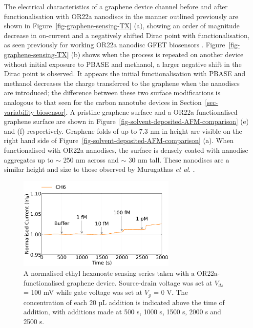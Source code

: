 \documentclass[
  a4paper,
]{scrbook}
\begin{document}
The electrical characteristics of a graphene device channel before and
after functionalisation with OR22a nanodiscs in the manner outlined
previously are shown in Figure~\ref{fig-graphene-sensing-TX} (a),
showing an order of magnitude decrease in on-current and a negatively
shifted Dirac point with functionalisation, as seen previously for
working OR22a nanodisc GFET biosensors \autocite{Murugathas2020}.
Figure~\ref{fig-graphene-sensing-TX} (b) shows when the process is
repeated on another device without initial exposure to PBASE and
methanol, a larger negative shift in the Dirac point is observed. It
appears the initial functionalisation with PBASE and methanol decreases
the charge transferred to the graphene when the nanodiscs are
introduced; the difference between these two surface modifications is
analogous to that seen for the carbon nanotube devices in
Section~\ref{sec-variability-biosensor}. A pristine graphene surface and
a OR22a-functionalised graphene surface are shown in
Figure~\ref{fig-solvent-deposited-AFM-comparison} (e) and (f)
respectively. Graphene folds of up to 7.3 nm in height are visible on
the right hand side of Figure~\ref{fig-solvent-deposited-AFM-comparison}
(a). When functionalised with OR22a nanodiscs, the surface is densely
coated with nanodisc aggregates up to \(\sim\) 250 nm across and
\(\sim\) 30 nm tall. These nanodiscs are a similar height and size to
those observed by Murugathas \emph{et al.} \autocite{Murugathas2020}.

\begin{figure}

{\centering \includegraphics[width=0.7\textwidth,height=\textheight]{figures/ch8/Q3C3_filtered_detrend_trunc_arrows_normalised.png}

}

\caption{\label{fig-graphene-sensing}A normalised ethyl hexanoate
sensing series taken with a OR22a-functionalised graphene device.
Source-drain voltage was set at \(V_{ds}\) = 100 mV while gate voltage
was set at \(V_g\) = 0 V. The concentration of each 20 µL addition is
indicated above the time of addition, with additions made at 500 s, 1000
s, 1500 s, 2000 s and 2500 s.}

\end{figure}
\end{document}
